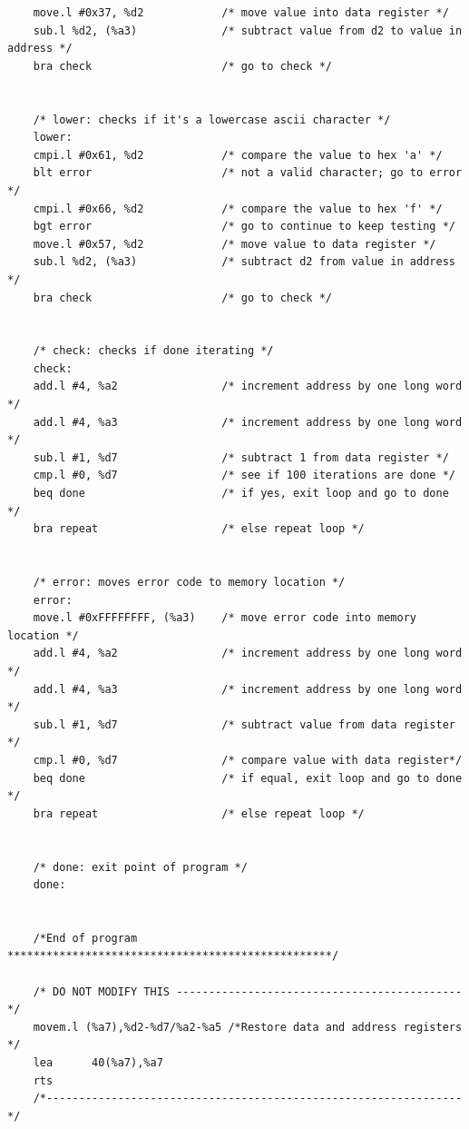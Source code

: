 \documentclass[10pt, letterpaper, titlepage]{article} %
\begin{document}
\begin{lstlisting}
	move.l #0x37, %d2            /* move value into data register */
	sub.l %d2, (%a3)             /* subtract value from d2 to value in address */
	bra check                    /* go to check */
	
	
	/* lower: checks if it's a lowercase ascii character */
	lower:
	cmpi.l #0x61, %d2            /* compare the value to hex 'a' */
	blt error                    /* not a valid character; go to error */
	cmpi.l #0x66, %d2            /* compare the value to hex 'f' */
	bgt error                    /* go to continue to keep testing */
	move.l #0x57, %d2            /* move value to data register */
	sub.l %d2, (%a3)             /* subtract d2 from value in address */
	bra check                    /* go to check */
	
	
	/* check: checks if done iterating */
	check:
	add.l #4, %a2                /* increment address by one long word */
	add.l #4, %a3                /* increment address by one long word */
	sub.l #1, %d7                /* subtract 1 from data register */
	cmp.l #0, %d7                /* see if 100 iterations are done */
	beq done                     /* if yes, exit loop and go to done */
	bra repeat                   /* else repeat loop */
	
	
	/* error: moves error code to memory location */
	error:
	move.l #0xFFFFFFFF, (%a3)    /* move error code into memory location */
	add.l #4, %a2                /* increment address by one long word */
	add.l #4, %a3                /* increment address by one long word */
	sub.l #1, %d7                /* subtract value from data register */
	cmp.l #0, %d7                /* compare value with data register*/
	beq done                     /* if equal, exit loop and go to done */
	bra repeat                   /* else repeat loop */
	
	
	/* done: exit point of program */
	done:
	
	
	/*End of program **************************************************/
	
	/* DO NOT MODIFY THIS --------------------------------------------*/
	movem.l (%a7),%d2-%d7/%a2-%a5 /*Restore data and address registers */
	lea      40(%a7),%a7 
	rts
	/*----------------------------------------------------------------*/
\end{lstlisting}
\end{document}
